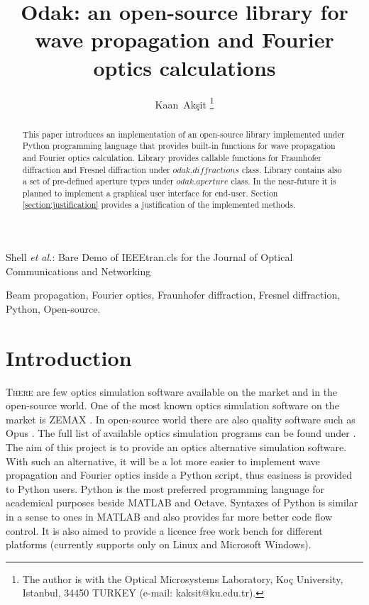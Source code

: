 \documentclass[journal,9pt]{IEEEtran}
\begin{document}
\title{Odak: an open-source library for wave propagation and Fourier optics calculations}
\author{Kaan~Ak\c{s}it
\thanks{The author is with the Optical Microsystems Laboratory, Ko\c{c} University, Istanbul,
34450 TURKEY (e-mail: kaksit@ku.edu.tr).}}
{Shell \MakeLowercase{\textit{et al.}}: Bare Demo of IEEEtran.cls
for the Journal of Optical Communications and Networking}


\maketitle
\begin{abstract}
This paper introduces an implementation of an open-source library implemented under Python programming language \cite{python} that provides built-in functions for wave propagation and Fourier optics calculation. Library provides callable functions for Fraunhofer diffraction and Fresnel diffraction under $odak.diffractions$ class. Library contains also a set of pre-defined aperture types under $odak.aperture$ class. In the near-future it is planned to implement a graphical user interface for end-user. Section \ref{section:justification} provides a justification of the implemented methods.
\end{abstract}
\begin{IEEEkeywords}
Beam propagation, Fourier optics, Fraunhofer diffraction, Fresnel diffraction, Python, Open-source.
\end{IEEEkeywords}
\IEEEpeerreviewmaketitle

\section{Introduction}
\label{section:introduction}
\lettrine{T}{here} are few optics simulation software available on the market and in the open-source world. One of the most known optics simulation software on the market is ZEMAX \cite{zemax}. In open-source world there are also quality software such as Opus \cite{opus}. The full list of available optics simulation programs can be found under \cite{optalix}. The aim of this project is to provide an optics alternative simulation software. With such an alternative, it will be a lot more easier to implement wave propagation and Fourier optics inside a Python script, thus easiness is provided to Python users. Python is the most preferred programming language for academical purposes beside MATLAB and Octave. Syntaxes of Python is similar in a sense to ones in MATLAB and also provides far more better code flow control. It is also aimed to provide a licence free work bench for different platforms (currently supports only on Linux and Microsoft Windows).
\end{document}
